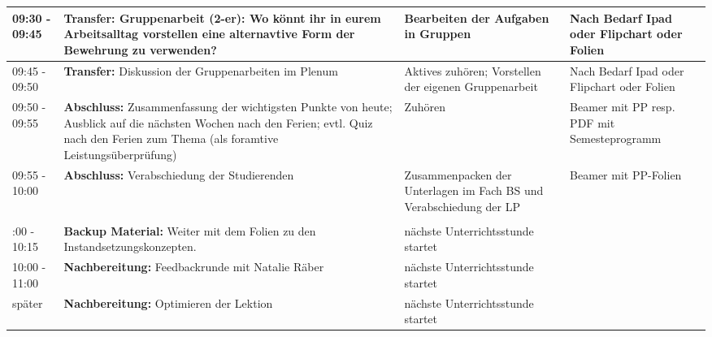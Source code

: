 \documentclass[
11pt,
captions=tableheading,
headsepline,
footsepline, 
captions=tableheading,
parskip=half-,
]{scrartcl}
\begin{document}
\begin{landscape}
\begin{longtable}{@{}l|p{9cm}p{7.5cm}p{3.5cm}@{}}
    \midrule
    09:30 - 09:45 & \textbf{Transfer:} Gruppenarbeit (2-er): Wo könnt ihr in eurem Arbeitsalltag vorstellen eine alternavtive Form der Bewehrung zu verwenden? & Bearbeiten der Aufgaben in Gruppen & Nach Bedarf Ipad oder Flipchart oder Folien\\
    \midrule
    09:45 - 09:50 & \textbf{Transfer:} Diskussion der Gruppenarbeiten im Plenum  & Aktives zuhören; Vorstellen der eigenen Gruppenarbeit & Nach Bedarf Ipad oder Flipchart oder Folien\\
    \midrule
    09:50 - 09:55 & \textbf{Abschluss:} Zusammenfassung der wichtigsten Punkte von heute; Ausblick auf die nächsten Wochen nach den Ferien; evtl. Quiz nach den Ferien zum Thema (als foramtive Leistungsüberprüfung)& Zuhören & Beamer mit PP resp. PDF mit Semesteprogramm\\
    \midrule
    09:55 - 10:00 & \textbf{Abschluss:} Verabschiedung der Studierenden & Zusammenpacken der Unterlagen im Fach BS und Verabschiedung der LP & Beamer mit PP-Folien\\
    \midrule
    \\ \addlinespace
    \midrule
    10:00 - 10:15 & \textbf{Backup Material:} Weiter mit dem Folien zu den Instandsetzungskonzepten. & nächste Unterrichtsstunde startet & {}\\
    \midrule
    10:00 - 11:00 & \textbf{Nachbereitung:} Feedbackrunde mit Natalie Räber & nächste Unterrichtsstunde startet & {}\\
    \midrule
    später & \textbf{Nachbereitung:} Optimieren der Lektion & nächste Unterrichtsstunde startet & {}\\
    \bottomrule
\end{longtable}
\end{landscape}
\clearpage
\end{document}
